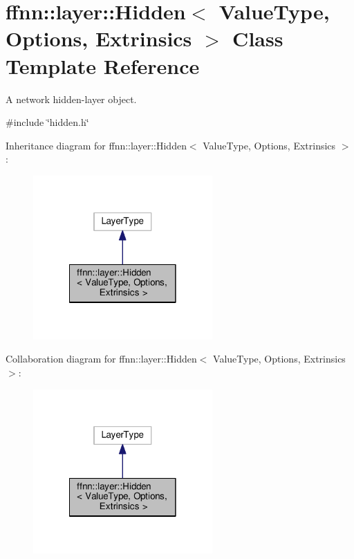 \hypertarget{classffnn_1_1layer_1_1_hidden}{\section{ffnn\-:\-:layer\-:\-:Hidden$<$ Value\-Type, Options, Extrinsics $>$ Class Template Reference}
\label{classffnn_1_1layer_1_1_hidden}
}


A network hidden-\/layer object.  




{\ttfamily \#include \char`\"{}hidden.\-h\char`\"{}}



Inheritance diagram for ffnn\-:\-:layer\-:\-:Hidden$<$ Value\-Type, Options, Extrinsics $>$\-:
\nopagebreak
\begin{figure}[H]
\begin{center}
\leavevmode
\includegraphics[width=194pt]{classffnn_1_1layer_1_1_hidden__inherit__graph}
\end{center}
\end{figure}


Collaboration diagram for ffnn\-:\-:layer\-:\-:Hidden$<$ Value\-Type, Options, Extrinsics $>$\-:
\nopagebreak
\begin{figure}[H]
\begin{center}
\leavevmode
\includegraphics[width=194pt]{classffnn_1_1layer_1_1_hidden__coll__graph}
\end{center}
\end{figure}

